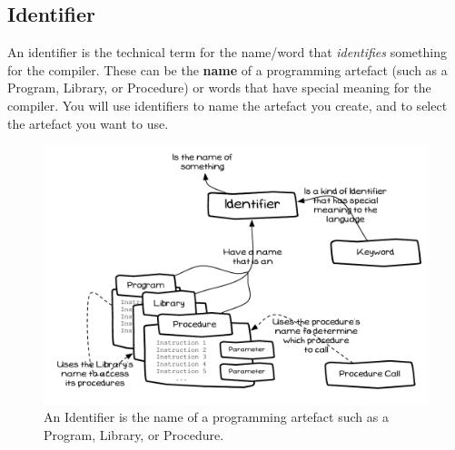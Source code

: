 \clearpage
\subsection{Identifier} %
\label{sub:identifier}

An identifier is the technical term for the name/word that \emph{identifies} something for the compiler. These can be the \textbf{name} of a programming artefact (such as a Program, Library, or Procedure) or words that have special meaning for the compiler. You will use identifiers to name the artefact you create, and to select the artefact you want to use.

\begin{figure}[h]
   \centering
   \includegraphics[width=\textwidth]{./topics/program-creation/diagrams/Identifier} 
   \caption[Identifier Concept Diagram]{An Identifier is the name of a programming artefact such as a Program, Library, or Procedure.}
   \label{fig:program-creation-identifier}
\end{figure}




